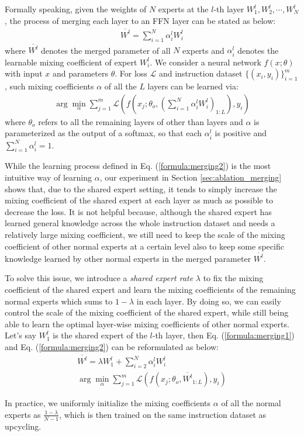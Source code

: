 Formally speaking, given the weights of $N$ experts at the $l$-th layer $W_1^l, W_2^l, \cdots, W_N^l$, the process of merging each \moe layer to an FFN layer can be stated as below:
\begin{equation}\label{formula:merging1}
\begin{split}
\overline{W^l} = \sum_{i=1}^{N}\alpha_{i}^lW_{i}^l
\end{split}
\end{equation}
where $\overline{W^l}$ denotes the merged parameter of all $N$ experts and $\alpha_i^l$ denotes the learnable mixing coefficient of expert $W_i^l$. We consider a neural network $f(x; \theta)$ with input $x$ and parameters $\theta$. For loss $\mathcal{L}$ and instruction dataset $\{(x_i,y_i)\}_{i=1}^m$, such mixing coefficients $\alpha$ of all the $L$ layers can be learned via:
\begin{equation}\label{formula:merging2}
\begin{split}
\arg\min_{\alpha}\sum_{j=1}^{m}\mathcal{L}(f(x_j; \theta_{o}, (\sum_{i=1}^{N}\alpha_{i}^lW_{i}^l)_{1:L}), y_i)
\end{split}
\end{equation}
where $\theta_{o}$ refers to all the remaining layers of \oursmoe other than \moe layers and $\alpha$ is parameterized as the output of a softmax, so that each $\alpha_i^l$ is positive and $\sum_{i=1}^N\alpha_i^l = 1$.

While the learning process defined in Eq. (\ref{formula:merging2}) is the most intuitive way of learning $\alpha$, our experiment in Section \ref{sec:ablation_merging} shows that, due to the shared expert setting, it tends to simply increase the mixing coefficient of the shared expert at each layer as much as possible to decrease the loss. It is not helpful because, although the shared expert has learned general knowledge across the whole instruction dataset and needs a relatively large mixing coefficient, we still need to keep the scale of the mixing coefficient of other normal experts at a certain level also to keep some specific knowledge learned by other normal experts in the merged parameter $\overline{W^l}$.

To solve this issue, we introduce a \textit{shared expert rate} $\lambda$ to fix the mixing coefficient of the shared expert and learn the mixing coefficients of the remaining normal experts which sums to $1-\lambda$ in each layer. By doing so, we can easily control the scale of the mixing coefficient of the shared expert, while still being able to learn the optimal layer-wise mixing coefficients of other normal experts. Let's say $W_1^l$ is the shared expert of the $l$-th layer, then Eq. (\ref{formula:merging1}) and Eq. (\ref{formula:merging2}) can be reformulated as below:
\begin{gather}
\overline{W^l} = \lambda W_{1}^l + \sum_{i=2}^{N}\alpha_{i}^lW_{i}^l\label{formula:merging1new}\\
\arg\min_{\alpha}\sum_{j=1}^{m}\mathcal{L}(f(x_j; \theta_o, \overline{W^l}_{1:L}), y_i)\label{formula:merging2new}
\end{gather}

In practice, we uniformly initialize the mixing coefficients $\alpha$ of all the normal experts as $\frac{1-\lambda}{N-1}$, which is then trained on the same instruction dataset as upcycling.
